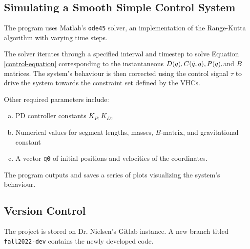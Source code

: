 \documentclass[main.tex]{subfiles}
\begin{document}
\subsection{Simulating a Smooth Simple Control System}
The program uses Matlab's \verb|ode45| solver, an implementation of the Range-Kutta algorithm with varying time steps\cite{senan2007brief}.

The solver iterates through a specified interval and timestep to solve Equation \ref{control-equation} corresponding to the instantaneous $D(q),C(\dot q,q),P(q),$and $B$ matrices. The system's behaviour is then corrected using the control signal $\tau$ to drive the system towards the constraint set defined by the VHCs.

Other required parameters include:
\begin{enumerate}[(a)]
    \item PD controller constants $K_P,K_D$,
    \item Numerical values for segment lengths, masses, $B$-matrix, and gravitational constant
    \item A vector \verb|q0| of initial positions and velocities of the coordinates.
\end{enumerate}

The program outputs and saves a series of plots visualizing the system's behaviour.
\subsection{Version Control}
The project is stored on Dr. Nielsen's Gitlab instance. A new branch titled \verb|fall2022-dev| contains the newly developed code.
\end{document}
